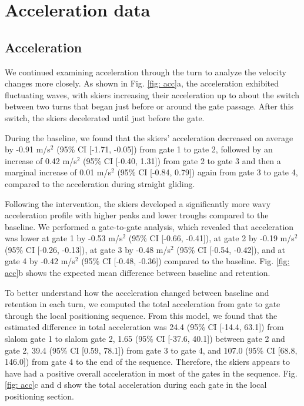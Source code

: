 \documentclass{article}
\begin{document}
\section{Acceleration data}

\subsection{Acceleration}
We continued examining acceleration through the turn to analyze the velocity changes more closely. As shown in Fig. \ref{fig: acc}a, the acceleration exhibited fluctuating waves, with skiers increasing their acceleration up to about the switch between two turns that began just before or around the gate passage. After this switch, the skiers decelerated until just before the gate. 

During the baseline, we found that the skiers' acceleration decreased on average by -0.91 m/s$^2$ (95\% CI [-1.71, -0.05]) from gate 1 to gate 2, followed by an increase of 0.42 m/s$^2$ (95\% CI [-0.40, 1.31]) from gate 2 to gate 3 and then a marginal increase of 0.01 m/s$^2$ (95\% CI [-0.84, 0.79]) again from gate 3 to gate 4, compared to the acceleration during straight gliding.

Following the intervention, the skiers developed a significantly more wavy acceleration profile with higher peaks and lower troughs compared to the baseline. We performed a gate-to-gate analysis, which revealed that acceleration was lower at gate 1 by -0.53  m/s$^2$ (95\% CI [-0.66, -0.41]), at gate 2 by -0.19  m/s$^2$ (95\% CI [-0.26, -0.13]), at gate 3 by -0.48  m/s$^2$ (95\% CI [-0.54, -0.42]), and at gate 4 by -0.42  m/s$^2$  (95\% CI [-0.48, -0.36]) compared to the baseline. Fig. \ref{fig: acc}b shows the expected mean difference between baseline and retention. 

To better understand how the acceleration changed between baseline and retention in each turn, we computed the total acceleration from gate to gate through the local positioning sequence. From this model, we found that the estimated difference in total acceleration was 24.4 (95\% CI [-14.4, 63.1]) from slalom gate 1 to slalom gate 2, 1.65 (95\% CI [-37.6, 40.1]) between gate 2 and gate 2, 39.4 (95\% CI [0.59, 78.1]) from gate 3 to gate 4, and 107.0 (95\% CI [68.8, 146.0]) from gate 4 to the end of the sequence. Therefore, the skiers appears to have had a positive overall acceleration in most of the gates in the sequence. Fig. \ref{fig: acc}c and d show the total acceleration during each gate in the local positioning section.
\end{document}
